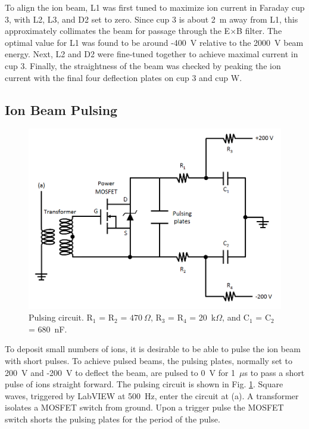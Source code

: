 To align the ion beam, L1 was first tuned to maximize ion current in Faraday cup 3, with L2, L3, and D2 set to zero.  Since cup 3 is about 2~m away from L1, this approximately collimates the beam for passage through the E$\times$B filter.  The optimal value for L1 was found to be around -400~V relative to the 2000~V beam energy.  Next, L2 and D2 were fine-tuned together to achieve maximal current in cup 3.  Finally, the straightness of the beam was checked by peaking the ion current with the final four deflection plates on cup 3 and cup W.



\subsection{Ion Beam Pulsing}

\begin{figure} %
        \centering
                \includegraphics[width=.8\textwidth]{figures/pulsing_circuit.png}
                \caption{Pulsing circuit.  R$_{1}$ = R$_{2}$ = $470~\Omega$, R$_{3}$ = R$_{4}$ = 20~k$\Omega$, and \newline C$_{1}$ = C$_{2}$ = 680~nF. \cite{Shon}}
\label{fig:pulse_circuit}
\end{figure}

To deposit small numbers of ions, it is desirable to be able to pulse the ion beam with short pulses.  To achieve pulsed beams, the pulsing plates, normally set to 200~V and -200~V to deflect the beam, are pulsed to 0~V for 1~$\mu$s to pass a short pulse of ions straight forward.  The pulsing circuit is shown in Fig. \ref{fig:pulse_circuit}.  Square waves, triggered by LabVIEW at 500~Hz, enter the circuit at (a). A transformer isolates a MOSFET switch from ground.  Upon a trigger pulse the MOSFET switch shorts the pulsing plates for the period of the pulse.

